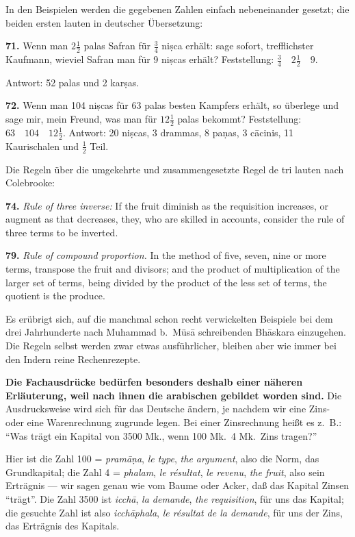 \documentclass[11pt,a4paper]{article}
\newcommand{\enquote}[1]{``#1''}
\begin{document}
In den Beispielen werden die gegebenen Zahlen einfach nebeneinander gesetzt; die beiden ersten lauten in deutscher \"Ubersetzung:

\textbf{71.} Wenn man $2\frac{1}{2}$ palas Safran f\"ur $\frac{3}{4}$ ni\d{s}ca erh\"alt: sage sofort, trefflichster Kaufmann, wieviel Safran man f\"ur 9 ni\d{s}cas erh\"alt? Feststellung: $\frac{3}{4}\quad 2\frac{1}{2}\quad 9$.

Antwort: 52 palas und 2 kar\d{s}as.

\textbf{72.} Wenn man 104 ni\d{s}cas f\"ur 63 palas besten Kampfers erh\"alt, so \"uberlege und sage mir, mein Freund, was man f\"ur $12\frac{1}{2}$ palas bekommt? Feststellung: $63\quad 104\quad 12\frac{1}{2}$. Antwort: 20 ni\d{s}cas, 3 drammas, 8 pa\d{n}as, 3 c\=acinis, 11 Kaurischalen und $\frac{1}{2}$ Teil.

Die Regeln \"uber die umgekehrte und zusammengesetzte Regel de tri lauten nach Colebrooke:

\textbf{74.} \textit{Rule of three inverse:} If the fruit diminish as the requisition increases, or augment as that decreases, they, who are skilled in accounts, consider the rule of three terms to be inverted.

\textbf{79.} \textit{Rule of compound proportion.} In the method of five, seven, nine or more terms, transpose the fruit and divisors; and the product of multiplication of the larger set of terms, being divided by the product of the less set of terms, the quotient is the produce.

Es er\"ubrigt sich, auf die manchmal schon recht verwickelten Beispiele bei dem drei Jahrhunderte nach Muhammad b.\ M\"us\=a schreibenden Bh\=askara einzugehen. Die Regeln selbst werden zwar etwas ausf\"uhrlicher, bleiben aber wie immer bei den Indern reine Rechenrezepte.

\textbf{Die Fachausdr\"ucke bed\"urfen besonders deshalb einer n\"aheren Erl\"auterung, weil nach ihnen die arabischen gebildet worden sind.} Die Ausdrucksweise wird sich f\"ur das Deutsche \"andern, je nachdem wir eine Zins- oder eine Warenrechnung zugrunde legen. Bei einer Zinsrechnung hei\ss{}t es z.\ B.: \enquote{Was tr\"agt ein Kapital von 3500 Mk., wenn 100 Mk.\ 4 Mk.\ Zins tragen?}

Hier ist die Zahl 100 = \textit{pram\=a\d{n}a}, \textit{le type}, \textit{the argument}, also die Norm, das Grundkapital; die Zahl 4 = \textit{phalam}, \textit{le r\'esultat}, \textit{le revenu}, \textit{the fruit}, also sein Ertr\"agnis --- wir sagen genau wie vom Baume oder Acker, da\ss{} das Kapital Zinsen \enquote{tr\"agt}. Die Zahl 3500 ist \textit{icch\=a}, \textit{la demande}, \textit{the requisition}, f\"ur uns das Kapital; die gesuchte Zahl ist also \textit{icch\=aphala}, \textit{le r\'esultat de la demande}, f\"ur uns der Zins, das Ertr\"agnis des Kapitals.
\end{document}
